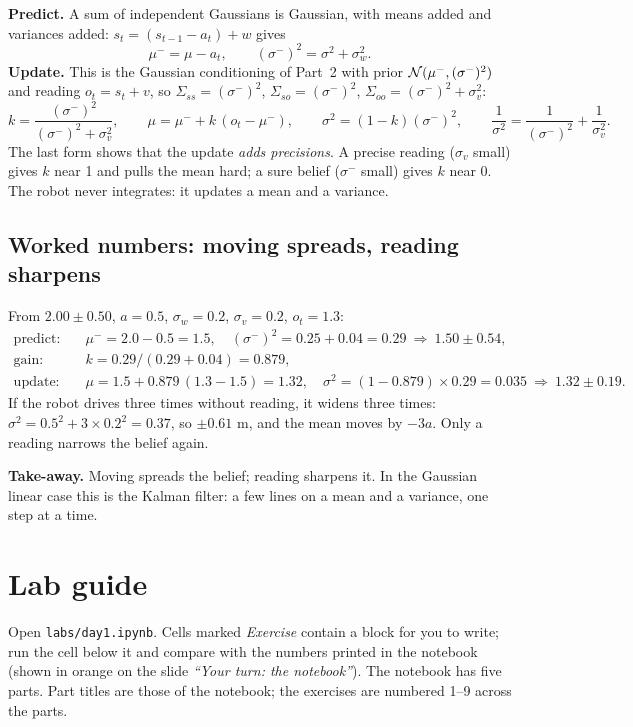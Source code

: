 \documentclass[11pt]{article}
\newcommand{\slide}[1]{\textit{``#1''}}
\begin{document}
\textbf{Predict.} A sum of independent Gaussians is Gaussian, with means added and variances added: $s_t=(s_{t-1}-a_t)+w$ gives
\[
\mu^-=\mu-a_t,\qquad (\sigma^-)^2=\sigma^2+\sigma_w^2 .
\]
\textbf{Update.} This is the Gaussian conditioning of Part~2 with prior $\mathcal{N}(\mu^-,(\sigma^-)^2)$ and reading $o_t=s_t+v$, so $\Sigma_{ss}=(\sigma^-)^2$, $\Sigma_{so}=(\sigma^-)^2$, $\Sigma_{oo}=(\sigma^-)^2+\sigma_v^2$:
\[
k=\frac{(\sigma^-)^2}{(\sigma^-)^2+\sigma_v^2},\qquad \mu=\mu^-+k\,(o_t-\mu^-),\qquad \sigma^2=(1-k)(\sigma^-)^2 ,\qquad \frac1{\sigma^2}=\frac1{(\sigma^-)^2}+\frac1{\sigma_v^2}.
\]
The last form shows that the update \emph{adds precisions}. A precise reading ($\sigma_v$ small) gives $k$ near 1 and pulls the mean hard; a sure belief ($\sigma^-$ small) gives $k$ near 0. The robot never integrates: it updates a mean and a variance.

\subsection*{Worked numbers: moving spreads, reading sharpens}
From $2.00\pm0.50$, $a=0.5$, $\sigma_w=0.2$, $\sigma_v=0.2$, $o_t=1.3$:
\begin{align*}
\text{predict:}\quad&\mu^-=2.0-0.5=1.5,\quad(\sigma^-)^2=0.25+0.04=0.29\ \Rightarrow\ 1.50\pm0.54,\\
\text{gain:}\quad&k=0.29/(0.29+0.04)=0.879,\\
\text{update:}\quad&\mu=1.5+0.879\,(1.3-1.5)=1.32,\quad\sigma^2=(1-0.879)\times0.29=0.035\ \Rightarrow\ 1.32\pm0.19 .
\end{align*}
If the robot drives three times without reading, it widens three times: $\sigma^2=0.5^2+3\times0.2^2=0.37$, so $\pm0.61$ m, and the mean moves by $-3a$. Only a reading narrows the belief again.

\begin{keyidea}
\textbf{Take-away.} Moving spreads the belief; reading sharpens it. In the Gaussian linear case this is the Kalman filter: a few lines on a mean and a variance, one step at a time.
\end{keyidea}

\section{Lab guide}

Open \texttt{labs/day1.ipynb}. Cells marked \emph{Exercise} contain a block for you to write; run the cell below it and compare with the numbers printed in the notebook (shown in orange on the slide \slide{Your turn: the notebook}). The notebook has five parts. Part titles are those of the notebook; the exercises are numbered 1--9 across the parts.
\end{document}
